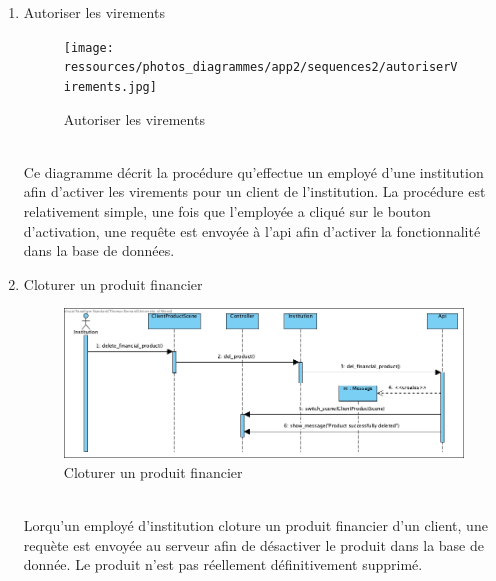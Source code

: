 \documentclass[../rapport.tex]{subfiles}
\begin{document}
\begin{enumerate}
	\item{Autoriser les virements}\\
		\begin{figure}[h]
			\centering\texttt{[image: ressources/photos\_diagrammes/app2/sequences2/autoriserVirements.jpg]}
			\caption{Autoriser les virements}
		\end{figure}\\
Ce diagramme décrit la procédure qu'effectue un employé d'une institution afin d'activer les virements pour un client de l'institution.
La procédure est relativement simple, une fois que l'employée a cliqué sur le bouton d'activation, une requête est envoyée à l'api afin d'activer la fonctionnalité dans la base de données.

	\item{Cloturer un produit financier}\\
		\begin{figure}[h]
			\centering\includegraphics[scale=0.25]{ressources/photos_diagrammes/app2/sequences2/cloturerProduitFinancier.jpg}
			\caption{Cloturer un produit financier}
		\end{figure}\\
Lorqu'un employé d'institution cloture un produit financier d'un client, une requète est envoyée au serveur afin de désactiver le produit dans la base de donnée. Le produit n'est pas réellement définitivement supprimé.


\end{enumerate}
\end{document}

